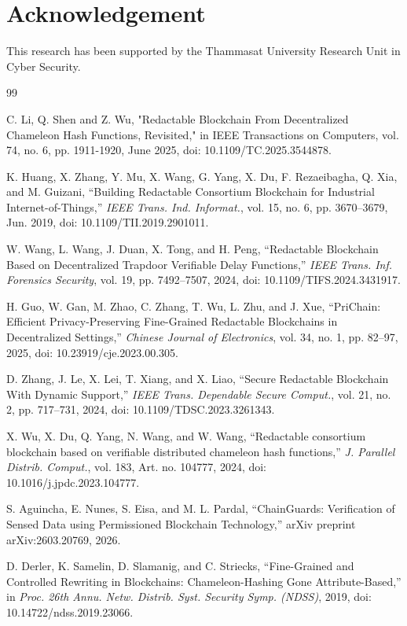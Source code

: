 \documentclass[lettersize,journal]{IEEEtran}
\begin{document}
\section{Acknowledgement}
This research has been supported by the Thammasat University Research Unit in Cyber Security.

 \begin{thebibliography}{99}

C. Li, Q. Shen and Z. Wu, "Redactable Blockchain From Decentralized Chameleon Hash Functions, Revisited," in IEEE Transactions on Computers, vol. 74, no. 6, pp. 1911-1920, June 2025, doi: 10.1109/TC.2025.3544878.




K. Huang, X. Zhang, Y. Mu, X. Wang, G. Yang, X. Du, F. Rezaeibagha, Q. Xia, and M. Guizani,
``Building Redactable Consortium Blockchain for Industrial Internet-of-Things,''
\textit{IEEE Trans. Ind. Informat.}, vol. 15, no. 6, pp. 3670--3679, Jun. 2019,
doi: 10.1109/TII.2019.2901011.

W. Wang, L. Wang, J. Duan, X. Tong, and H. Peng,
``Redactable Blockchain Based on Decentralized Trapdoor Verifiable Delay Functions,''
\textit{IEEE Trans. Inf. Forensics Security}, vol. 19, pp. 7492--7507, 2024,
doi: 10.1109/TIFS.2024.3431917.

H. Guo, W. Gan, M. Zhao, C. Zhang, T. Wu, L. Zhu, and J. Xue,
``PriChain: Efficient Privacy-Preserving Fine-Grained Redactable Blockchains in Decentralized Settings,''
\textit{Chinese Journal of Electronics}, vol. 34, no. 1, pp. 82--97, 2025,
doi: 10.23919/cje.2023.00.305.

D. Zhang, J. Le, X. Lei, T. Xiang, and X. Liao,
``Secure Redactable Blockchain With Dynamic Support,''
\textit{IEEE Trans. Dependable Secure Comput.}, vol. 21, no. 2, pp. 717--731, 2024,
doi: 10.1109/TDSC.2023.3261343.

X. Wu, X. Du, Q. Yang, N. Wang, and W. Wang,
``Redactable consortium blockchain based on verifiable distributed chameleon hash functions,''
\textit{J. Parallel Distrib. Comput.}, vol. 183, Art. no. 104777, 2024,
doi: 10.1016/j.jpdc.2023.104777.

S. Aguincha, E. Nunes, S. Eisa, and M. L. Pardal,
``ChainGuards: Verification of Sensed Data using Permissioned Blockchain Technology,''
arXiv preprint arXiv:2603.20769, 2026.

D. Derler, K. Samelin, D. Slamanig, and C. Striecks,
``Fine-Grained and Controlled Rewriting in Blockchains: Chameleon-Hashing Gone Attribute-Based,''
in \textit{Proc. 26th Annu. Netw. Distrib. Syst. Security Symp. (NDSS)}, 2019,
doi: 10.14722/ndss.2019.23066.


\end{thebibliography}
\end{document}
